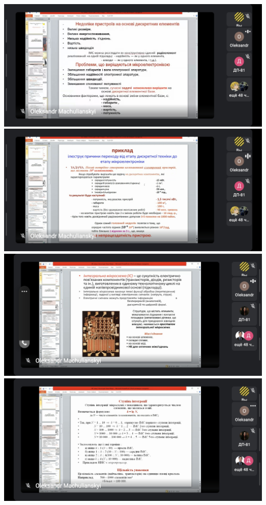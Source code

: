 \documentclass[a4paper,14pt]{extreport}
\begin{document}
\begin{center}
\includegraphics[scale = 0.3]{9.jpg}
\includegraphics[scale = 0.3]{10.jpg}
\includegraphics[scale = 0.3]{11.jpg}
\includegraphics[scale = 0.3]{12.jpg}

\end{center}
\end{document}
